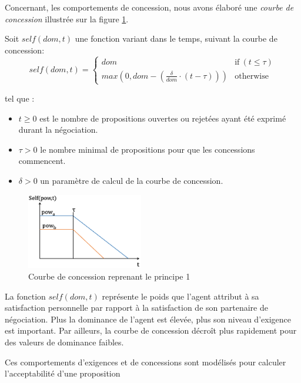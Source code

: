 	
	Concernant, les comportements de concession, nous avons élaboré une \emph {courbe de concession} illustrée sur la figure \ref{fig:conc}. 
	

	Soit $ self (dom, t) $ une fonction variant dans le temps, suivant la courbe de concession:
	\begin{equation}
	self(dom, t) = \left\{\begin{array}{ll}
	dom & \mathrm{if\ } (t \leq \tau)\\
	max(0, dom - (\frac{\delta}{dom} \cdot (t - \tau))) & \mathrm{otherwise}
	\end{array}\right.
	\end{equation}
	
	
	
	tel que :
	\begin{itemize}
		\item $t \geq 0$ est le nombre de propositions ouvertes ou rejetées ayant été exprimé durant la négociation.
		\item $\tau > 0$ le nombre minimal de propositions pour que les concessions commencent.
		\item  $\delta > 0$ un paramètre de calcul de la courbe de concession.
		
	\end{itemize}  
			

	
		\begin{figure}[h]
			\includegraphics[width=2in]{Figures/chap4/self.png}
			\caption{\label{fig:conc}Courbe de concession reprenant le principe 1}
		\end{figure} 
		
		La fonction $self(dom,t)$ représente le poids que l'agent attribut à sa satisfaction personnelle par rapport à la satisfaction de son partenaire de négociation. Plus la dominance de l'agent est élevée, plus son niveau d'exigence est important. Par ailleurs, la courbe de concession décroît plus rapidement pour des valeurs de dominance faibles.
		
		
	Ces comportements d'exigences et de concessions sont modélisés pour calculer l'acceptabilité d'une proposition 
	
